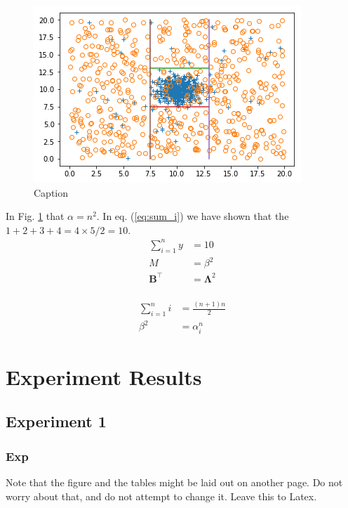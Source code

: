 \documentclass{svproc}
\begin{document}
    
    \begin{figure}
        \centering
        \includegraphics[scale=.75]{figures/DecisionBoundary.png}
        \caption{Caption}
        \label{fig:my_label}
    \end{figure}


    
    In Fig. \ref{fig:my_label} that $\alpha = n^2$. In eq. (\ref{eq:sum_i}) we have shown that the $ 1+2+3+4 = 4\times 5 /2=10$.
    \begin{align*}
        \sum_{i=1}^{n} y &= 10 \\
        M &= \beta ^2 \\
        \boldsymbol{B}^\top &= \boldsymbol{\Lambda}^2 \\
    \end{align*}
    
    \begin{align}
        \label{eq:sum_i}
        \sum_{i=1}^n i &= \frac{(n+1)n}{2} \\  
        \nonumber
        \beta ^2 &= \alpha_i^n
    \end{align}

\section{Experiment Results}
    \subsection{Experiment 1}
        \subsubsection{Exp}
    Note that the figure and the tables might be laid out on another page. Do not worry about that, and do not attempt to change it. Leave this to Latex.
    
\end{document}
